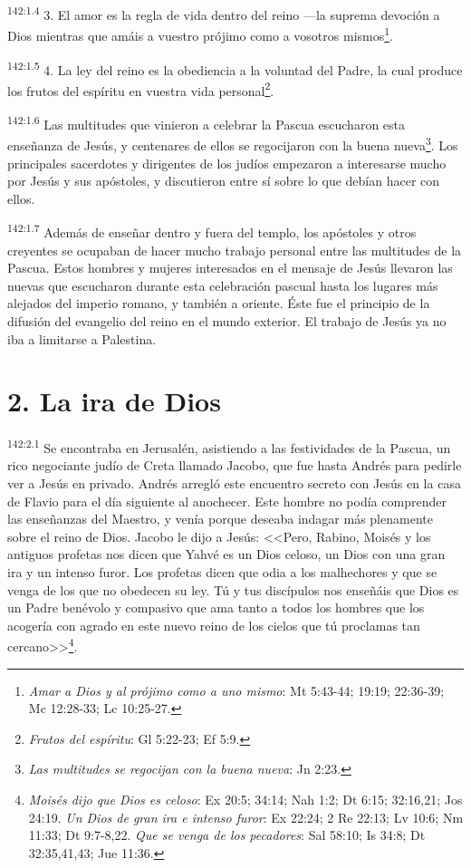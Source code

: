 \par 
\textsuperscript{142:1.4} 3. El amor es la regla de vida dentro del reino ---la suprema devoción a Dios mientras que amáis a vuestro prójimo como a vosotros mismos\footnote{\textit{Amar a Dios y al prójimo como a uno mismo}: Mt 5:43-44; 19:19; 22:36-39; Mc 12:28-33; Lc 10:25-27.}.

\par 
\textsuperscript{142:1.5} 4. La ley del reino es la obediencia a la voluntad del Padre, la cual produce los frutos del espíritu en vuestra vida personal\footnote{\textit{Frutos del espíritu}: Gl 5:22-23; Ef 5:9.}.

\par 
\textsuperscript{142:1.6} Las multitudes que vinieron a celebrar la Pascua escucharon esta enseñanza de Jesús, y centenares de ellos se regocijaron con la buena nueva\footnote{\textit{Las multitudes se regocijan con la buena nueva}: Jn 2:23.}. Los principales sacerdotes y dirigentes de los judíos empezaron a interesarse mucho por Jesús y sus apóstoles, y discutieron entre sí sobre lo que debían hacer con ellos.

\par 
\textsuperscript{142:1.7} Además de enseñar dentro y fuera del templo, los apóstoles y otros creyentes se ocupaban de hacer mucho trabajo personal entre las multitudes de la Pascua. Estos hombres y mujeres interesados en el mensaje de Jesús llevaron las nuevas que escucharon durante esta celebración pascual hasta los lugares más alejados del imperio romano, y también a oriente. Éste fue el principio de la difusión del evangelio del reino en el mundo exterior. El trabajo de Jesús ya no iba a limitarse a Palestina.

\section*{2. La ira de Dios}
\par 
\textsuperscript{142:2.1} Se encontraba en Jerusalén, asistiendo a las festividades de la Pascua, un rico negociante judío de Creta llamado Jacobo, que fue hasta Andrés para pedirle ver a Jesús en privado. Andrés arregló este encuentro secreto con Jesús en la casa de Flavio para el día siguiente al anochecer. Este hombre no podía comprender las enseñanzas del Maestro, y venía porque deseaba indagar más plenamente sobre el reino de Dios. Jacobo le dijo a Jesús: <<Pero, Rabino, Moisés y los antiguos profetas nos dicen que Yahvé es un Dios celoso, un Dios con una gran ira y un intenso furor. Los profetas dicen que odia a los malhechores y que se venga de los que no obedecen su ley. Tú y tus discípulos nos enseñáis que Dios es un Padre benévolo y compasivo que ama tanto a todos los hombres que los acogería con agrado en este nuevo reino de los cielos que tú proclamas tan cercano>>\footnote{\textit{Moisés dijo que Dios es celoso}: Ex 20:5; 34:14; Nah 1:2; Dt 6:15; 32:16,21; Jos 24:19. \textit{Un Dios de gran ira e intenso furor}: Ex 22:24; 2 Re 22:13; Lv 10:6; Nm 11:33; Dt 9:7-8,22. \textit{Que se venga de los pecadores}: Sal 58:10; Is 34:8; Dt 32:35,41,43; Jue 11:36.}.

